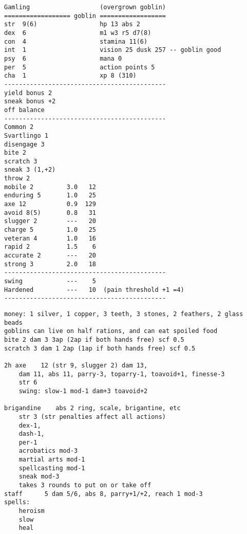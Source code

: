\pagebreak[2]
\small
\begin{verbatim}
Gamling                   (overgrown goblin)
================== goblin ==================
str  9(6)                 hp 13 abs 2
dex  6                    m1 w3 r5 d7(8)
con  4                    stamina 11(6)
int  1                    vision 25 dusk 257 -- goblin good
psy  6                    mana 0
per  5                    action points 5
cha  1                    xp 8 (310)
--------------------------------------------
yield bonus 2
sneak bonus +2
off balance
--------------------------------------------
Common 2
Svartlingo 1
disengage 3
bite 2
scratch 3
sneak 3 (1,+2)
throw 2
mobile 2         3.0   12
enduring 5       1.0   25
axe 12           0.9  129
avoid 8(5)       0.8   31
slugger 2        ---   20
charge 5         1.0   25
veteran 4        1.0   16
rapid 2          1.5    6
accurate 2       ---   20
strong 3         2.0   18
--------------------------------------------
swing            ---    5
Hardened         ---   10  (pain threshold +1 =4)
--------------------------------------------
\end{verbatim} \goodbreak \begin{verbatim}
money: 1 silver, 1 copper, 3 teeth, 3 stones, 2 feathers, 2 glass beads
goblins can live on half rations, and can eat spoiled food
bite 2 dam 3 3ap (2ap if both hands free) scf 0.5
scratch 3 dam 1 2ap (1ap if both hands free) scf 0.5

2h axe    12 (str 9, slugger 2) dam 13,
    dam 11, abs 11, parry-3, toparry-1, toavoid+1, finesse-3
    str 6
    swing: slow-1 mod-1 dam+3 toavoid+2

brigandine    abs 2 ring, scale, brigantine, etc
    str 3 (str penalties affect all actions)
    dex-1,
    dash-1,
    per-1
    acrobatics mod-3
    martial arts mod-1
    spellcasting mod-1
    sneak mod-3
    takes 3 rounds to put on or take off
staff      5 dam 5/6, abs 8, parry+1/+2, reach 1 mod-3
spells:
    heroism
    slow
    heal





\end{verbatim}
